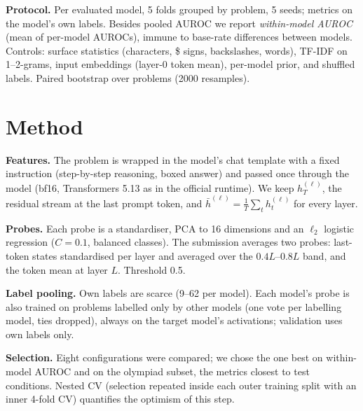 \documentclass[10pt]{article}
\begin{document}
\textbf{Protocol.} Per evaluated model, 5 folds grouped by problem, 5 seeds; metrics on the model's own labels. Besides pooled AUROC we report \emph{within-model AUROC} (mean of per-model AUROCs), immune to base-rate differences between models. Controls: surface statistics (characters, \$ signs, backslashes, words), TF-IDF on 1--2-grams, input embeddings (layer-0 token mean), per-model prior, and shuffled labels. Paired bootstrap over problems (2000 resamples).

\section{Method}
\textbf{Features.} The problem is wrapped in the model's chat template with a fixed instruction (step-by-step reasoning, boxed answer) and passed once through the model (bf16, Transformers 5.13 as in the official runtime). We keep $h^{(\ell)}_{T}$, the residual stream at the last prompt token, and $\bar h^{(\ell)}=\frac1T\sum_t h^{(\ell)}_t$ for every layer.

\textbf{Probes.} Each probe is a standardiser, PCA to 16 dimensions and an $\ell_2$ logistic regression ($C=0.1$, balanced classes). The submission averages two probes: last-token states standardised per layer and averaged over the $0.4L$--$0.8L$ band, and the token mean at layer $L$. Threshold 0.5.

\textbf{Label pooling.} Own labels are scarce (9--62 per model). Each model's probe is also trained on problems labelled only by other models (one vote per labelling model, ties dropped), always on the target model's activations; validation uses own labels only.

\textbf{Selection.} Eight configurations were compared; we chose the one best on within-model AUROC and on the olympiad subset, the metrics closest to test conditions. Nested CV (selection repeated inside each outer training split with an inner 4-fold CV) quantifies the optimism of this step.
\end{document}
